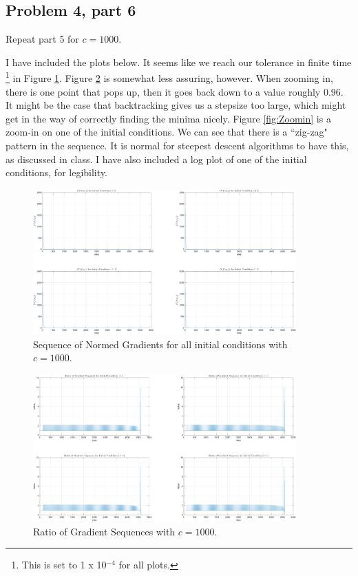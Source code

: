 \subsection{Problem 4, part 6}
Repeat part 5 for $c = 1000$.
\partbreak
\begin{solution}

    I have included the plots below. It seems like we reach our tolerance in finite time \footnote{This is set to 1 x 10$^{-4}$ for all plots.} in Figure \ref{fig:NormGradient1000}. Figure \ref{fig:PlotSeq1000} is somewhat less assuring, however. When zooming in, there is one point that pops up, then it goes back down to a value roughly 0.96. It might be the case that backtracking gives us a stepsize too large, which might get in the way of correctly finding the minima nicely. Figure \ref{fig:Zoomin} is a zoom-in on one of the initial conditions. We can see that there is a ``zig-zag" pattern in the sequence. It is normal for steepest descent algorithms to have this, as discussed in class. I have also included a log plot of one of the initial conditions, for legibility. 
\end{solution}
\vspace{2cm}
\begin{figure}[!h]
    \centering
    \includegraphics[width = 0.9\textwidth]{Plots/NormGradient1000.png}
    \caption{Sequence of Normed Gradients for all initial conditions with $c = 1000$.}
    \label{fig:NormGradient1000}
\end{figure}

\clearpage
\newpage
\begin{figure}
    \centering
    \includegraphics[width = 0.9\textwidth]{Plots/RatioSeq1000.png}
    \caption{Ratio of Gradient Sequences with $c = 1000$.}
    \label{fig:PlotSeq1000}
\end{figure}

